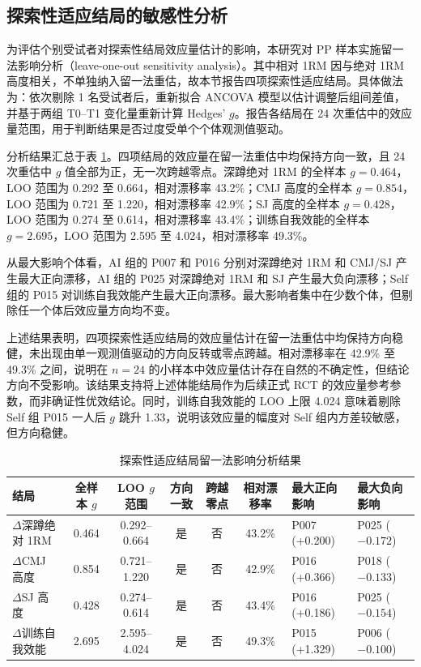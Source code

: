 \documentclass[UTF8,zihao=-4,twoside,openany]{ctexbook}
\begin{document}
\subsection{探索性适应结局的敏感性分析}
为评估个别受试者对探索性结局效应量估计的影响，本研究对 PP 样本实施留一法影响分析（leave-one-out sensitivity analysis）。其中相对 1RM 因与绝对 1RM 高度相关，不单独纳入留一法重估，故本节报告四项探索性适应结局。具体做法为：依次剔除 1 名受试者后，重新拟合 ANCOVA 模型以估计调整后组间差值，并基于两组 T0--T1 变化量重新计算 Hedges' $g$。报告各结局在 24 次重估中的效应量范围，用于判断结果是否过度受单个个体观测值驱动。

分析结果汇总于表 \ref{tab:ch4-loo}。四项结局的效应量在留一法重估中均保持方向一致，且 24 次重估中 $g$ 值全部为正，无一次跨越零点。深蹲绝对 1RM 的全样本 $g = 0.464$，LOO 范围为 0.292 至 0.664，相对漂移率 43.2\%；CMJ 高度的全样本 $g = 0.854$，LOO 范围为 0.721 至 1.220，相对漂移率 42.9\%；SJ 高度的全样本 $g = 0.428$，LOO 范围为 0.274 至 0.614，相对漂移率 43.4\%；训练自我效能的全样本 $g = 2.695$，LOO 范围为 2.595 至 4.024，相对漂移率 49.3\%。

从最大影响个体看，AI 组的 P007 和 P016 分别对深蹲绝对 1RM 和 CMJ/SJ 产生最大正向漂移，AI 组的 P025 对深蹲绝对 1RM 和 SJ 产生最大负向漂移；Self 组的 P015 对训练自我效能产生最大正向漂移。最大影响者集中在少数个体，但剔除任一个体后效应量方向均不变。

上述结果表明，四项探索性适应结局的效应量估计在留一法重估中均保持方向稳健，未出现由单一观测值驱动的方向反转或零点跨越。相对漂移率在 42.9\% 至 49.3\% 之间，说明在 $n=24$ 的小样本中效应量估计存在自然的不确定性，但结论方向不受影响。该结果支持将上述体能结局作为后续正式 RCT 的效应量参考参数，而非确证性优效结论。同时，训练自我效能的 LOO 上限 4.024 意味着剔除 Self 组 P015 一人后 $g$ 跳升 1.33，说明该效应量的幅度对 Self 组内方差较敏感，但方向稳健。

\begin{table}[htbp]
  \centering
  \caption{探索性适应结局留一法影响分析结果}
  \label{tab:ch4-loo}
  \vspace{6pt}
  \fontsize{8.5pt}{11pt}\selectfont
  \begin{tabularx}{\textwidth}{lcccccll}
    \toprule
    \textbf{结局} & \textbf{全样本 $g$} & \textbf{LOO $g$ 范围} & \textbf{方向一致} & \textbf{跨越零点} & \textbf{相对漂移率} & \textbf{最大正向影响} & \textbf{最大负向影响} \\
    \midrule
    $\Delta$深蹲绝对 1RM & 0.464 & 0.292--0.664 & 是 & 否 & 43.2\% & P007 (+0.200) & P025 ($-0.172$) \\
    $\Delta$CMJ 高度 & 0.854 & 0.721--1.220 & 是 & 否 & 42.9\% & P016 (+0.366) & P018 ($-0.133$) \\
    $\Delta$SJ 高度 & 0.428 & 0.274--0.614 & 是 & 否 & 43.4\% & P016 (+0.186) & P025 ($-0.154$) \\
    $\Delta$训练自我效能 & 2.695 & 2.595--4.024 & 是 & 否 & 49.3\% & P015 (+1.329) & P006 ($-0.100$) \\
    \bottomrule
  \end{tabularx}
\end{table}
\end{document}
